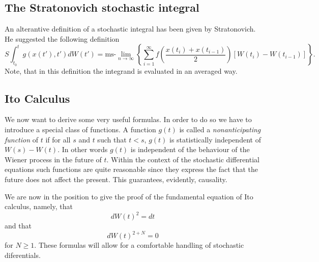 \subsection{The Stratonovich stochastic integral}
\label{STRATONOVICHSUB}
An alterantive definition of a stochastic  integral has been given by
Stratonovich. He suggested the following definition
\begin{equation}
\label{STRATONOVICHDEFI}
S\int_{t_0}^t g(x(t'),t') dW(t') = \text{ms-}\lim_{n \rightarrow \infty}
   \left\{ \sum_{i=1}^{\infty} f( \frac{x(t_{i})+ x(t_{i-1})}{2}) 
[W(t_i) - W(t_{i-1})]   \right\}.
\end{equation}
Note, that in this definition the integrand is evaluated in an
averaged way.

\subsection{Ito Calculus}
We now want to derive some very useful formulas. In order to do so 
we have to introduce a special class of functions. A function $g(t)$
is called a {\em nonanticipating function} of $t$ if for all
$s$ and $t$ such that $t<s$, $g(t)$ is statistically independent 
of $W(s)-W(t)$. In other words $g(t)$ is independent of the 
behaviour of the Wiener process in the future of $t$. Within the 
context of the stochastic differential equations such functions 
are quite reasonable since they express the fact that the future 
does not affect the present. This guarantees, evidently, 
causality.

We are now in the position to give the proof of the fundamental 
equation of Ito calculus, namely, that
\begin{equation*}
dW(t)^2 = dt 
\end{equation*}
and that
\begin{equation*}
dW(t)^{2+N} =0 
\end{equation*}
for $N \ge 1$. These formulas will allow for a comfortable 
handling of stochastic diferentials.

